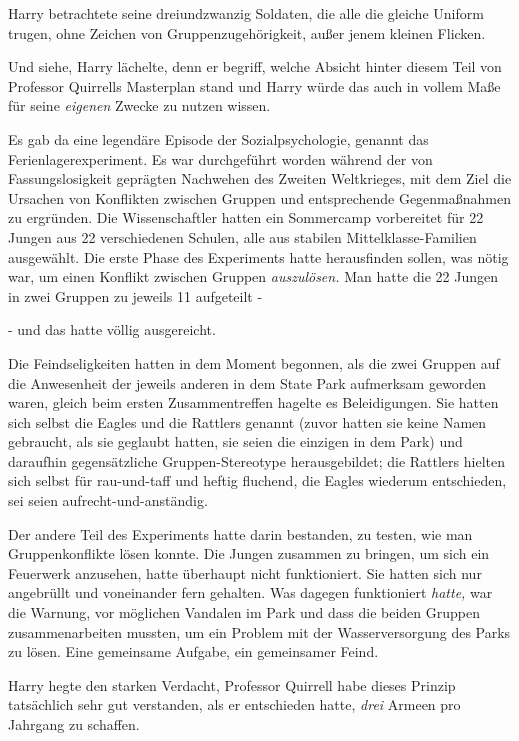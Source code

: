 {Harry betrachtete seine dreiundzwanzig Soldaten, die alle die gleiche Uniform trugen, ohne Zeichen von Gruppenzugehörigkeit, außer jenem kleinen Flicken.

Und siehe, Harry lächelte, denn er begriff, welche Absicht hinter diesem Teil von Professor Quirrells Masterplan stand und Harry würde das auch in vollem Maße für seine \emph{eigenen} Zwecke zu nutzen wissen.

Es gab da eine legendäre Episode der Sozialpsychologie, genannt das Ferienlagerexperiment. Es war durchgeführt worden während der von Fassungslosigkeit geprägten Nachwehen des Zweiten Weltkrieges, mit dem Ziel die Ursachen von Konflikten zwischen Gruppen und entsprechende Gegenmaßnahmen zu ergründen. Die Wissenschaftler hatten ein Sommercamp vorbereitet für 22 Jungen aus 22 verschiedenen Schulen, alle aus stabilen Mittelklasse-Familien ausgewählt. Die erste Phase des Experiments hatte herausfinden sollen, was nötig war, um einen Konflikt zwischen Gruppen \emph{auszulösen.} Man hatte die 22 Jungen in zwei Gruppen zu jeweils 11 aufgeteilt -

- und das hatte völlig ausgereicht.

Die Feindseligkeiten hatten in dem Moment begonnen, als die zwei Gruppen auf die Anwesenheit der jeweils anderen in dem State Park aufmerksam geworden waren, gleich beim ersten Zusammentreffen hagelte es Beleidigungen. Sie hatten sich selbst die Eagles und die Rattlers genannt (zuvor hatten sie keine Namen gebraucht, als sie geglaubt hatten, sie seien die einzigen in dem Park) und daraufhin gegensätzliche Gruppen-Stereotype herausgebildet; die Rattlers hielten sich selbst für rau-und-taff und heftig fluchend, die Eagles wiederum entschieden, sei seien aufrecht-und-anständig.

Der andere Teil des Experiments hatte darin bestanden, zu testen, wie man Gruppenkonflikte lösen konnte. Die Jungen zusammen zu bringen, um sich ein Feuerwerk anzusehen, hatte überhaupt nicht funktioniert. Sie hatten sich nur angebrüllt und voneinander fern gehalten. Was dagegen funktioniert \emph{hatte,} war die Warnung, vor möglichen Vandalen im Park und dass die beiden Gruppen zusammenarbeiten mussten, um ein Problem mit der Wasserversorgung des Parks zu lösen. Eine gemeinsame Aufgabe, ein gemeinsamer Feind.

Harry hegte den starken Verdacht, Professor Quirrell habe dieses Prinzip tatsächlich sehr gut verstanden, als er entschieden hatte, \emph{drei} Armeen pro Jahrgang zu schaffen.

}
